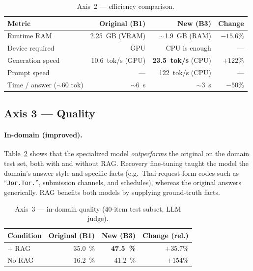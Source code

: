 \documentclass[11pt,a4paper]{article}
\begin{document}
\begin{table}[H]
  \centering
  \caption{Axis~2 --- efficiency comparison.}
  \label{tab:speed}
  \begin{tabular}{lrrr}
    \toprule
    \textbf{Metric} & \textbf{Original (B1)} & \textbf{New (B3)} & \textbf{Change} \\
    \midrule
    Runtime RAM            & \SI{2.25}{GB} (VRAM) & $\sim$\SI{1.9}{GB} (RAM) & $-15.6\%$ \\
    Device required        & GPU                  & CPU is enough            & --- \\
    Generation speed       & \SI{10.6}{tok/s} (GPU) & \textbf{\SI{23.5}{tok/s}} (CPU) & $+122\%$ \\
    Prompt speed           & ---                  & \SI{122}{tok/s} (CPU)    & --- \\
    Time / answer ($\sim$60 tok) & $\sim$\SI{6}{s} & $\sim$\SI{3}{s}          & $-50\%$ \\
    \bottomrule
  \end{tabular}
\end{table}

\subsection{Axis 3 --- Quality}
\paragraph{In-domain (improved).} Table~\ref{tab:quality} shows that the
specialized model \emph{outperforms} the original on the domain test set,
both with and without RAG. Recovery fine-tuning taught the model the
domain's answer style and specific facts (e.g.\ Thai request-form codes
such as ``\texttt{Jor.Tor.}'', submission channels, and schedules), whereas
the original answers generically. RAG benefits both models by supplying
ground-truth facts.

\begin{table}[H]
  \centering
  \caption{Axis~3 --- in-domain quality (40-item test subset, LLM judge).}
  \label{tab:quality}
  \begin{tabular}{lrrr}
    \toprule
    \textbf{Condition} & \textbf{Original (B1)} & \textbf{New (B3)} & \textbf{Change (rel.)} \\
    \midrule
    $+$ RAG  & \SI{35.0}{\percent} & \textbf{\SI{47.5}{\percent}} & $+35.7\%$ \\
    No RAG   & \SI{16.2}{\percent} & \SI{41.2}{\percent}          & $+154\%$ \\
    \bottomrule
  \end{tabular}
\end{table}
\end{document}
